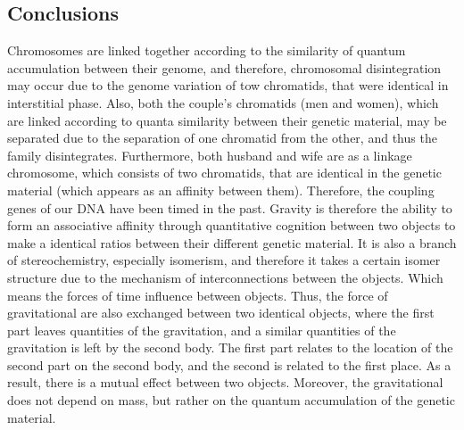 \begin{Summary}
{{{{\section{Conclusions}
Chromosomes are linked together according to the similarity of quantum accumulation between their genome, and therefore, chromosomal disintegration may occur due to the genome variation of tow chromatids, that were identical in interstitial phase.
Also, both the couple's chromatids (men and women), which are linked according to quanta similarity between their genetic material, may be separated due to the separation of one chromatid from the other, and thus the family disintegrates. Furthermore, both husband and wife are as a linkage chromosome, which consists of two chromatids, that are identical in the genetic material (which appears as an affinity between them). Therefore, the coupling genes of our DNA have been timed in the past.
Gravity is therefore the ability to form an associative affinity through quantitative cognition between two objects to make a identical ratios between their different genetic material. It is also a branch of stereochemistry, especially isomerism, and therefore it takes a certain isomer structure due to the mechanism of interconnections between the objects. Which means the forces of time influence between objects.
Thus, the force of gravitational are also exchanged between two identical objects, where the first part leaves quantities of the gravitation, and a similar quantities of the gravitation is left by the second body. The first part relates to the location of the second part on the second body, and the second is related to the first place. As a result, there is a mutual effect between two objects. Moreover, the gravitational does not depend on mass, but rather on the quantum accumulation of the genetic material.
}}}}
\end{Summary}
